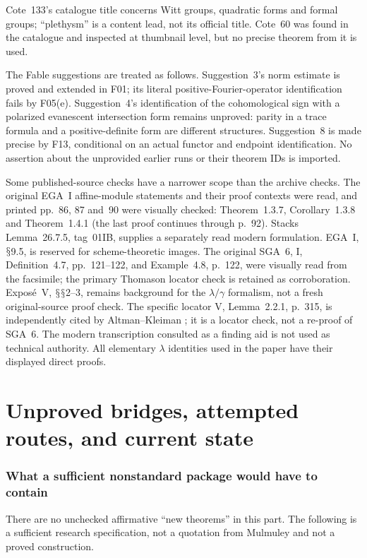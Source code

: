 \documentclass[11pt,a4paper]{article}
\renewcommand{\S}{\ensuremath{\mathsection}}
\newcommand{\fid}[1]{\textsf{#1}}\newcommand{\gate}[1]{\textsf{#1}}
\theoremstyle{named}\newtheorem{finding}{Finding}[section]
\theoremstyle{definition}\newtheorem{definition}[finding]{Definition}
\theoremstyle{remark}\newtheorem{remark}[finding]{Remark}
\begin{document}
Cote~133's catalogue title concerns Witt groups, quadratic forms and formal groups; ``plethysm'' is a content lead, not its official title. Cote~60 was found in the catalogue and inspected at thumbnail level, but no precise theorem from it is used.

The Fable suggestions are treated as follows. Suggestion~3's norm estimate is proved and extended in \fid{F01}; its literal positive-Fourier-operator identification fails by \fid{F05}(e). Suggestion~4's identification of the cohomological sign with a polarized evanescent intersection form remains unproved: parity in a trace formula and a positive-definite form are different structures. Suggestion~8 is made precise by \fid{F13}, conditional on an actual functor and endpoint identification. No assertion about the unprovided earlier runs or their theorem IDs is imported.

Some published-source checks have a narrower scope than the archive checks.
The original EGA~I affine-module statements and their proof
contexts were read, and printed pp.~86, 87 and~90 were visually
checked: Theorem~1.3.7, Corollary~1.3.8 and Theorem~1.4.1
(the last proof continues through p.~92). Stacks Lemma~26.7.5,
tag~01IB, supplies a separately read modern formulation.
EGA~I, \S9.5, is reserved for scheme-theoretic images.
The original SGA~6, I, Definition~4.7, pp.~121--122, and
Example~4.8, p.~122, were visually read from the facsimile;
the primary Thomason locator check
\cite[\S3.1, pp.~8--9]{ThomasonPerfect} is retained as
corroboration. Expos\'e~V, \S\S2--3, remains background for
the $\lambda/\gamma$ formalism, not a fresh original-source
proof check. The specific locator V, Lemma~2.2.1, p.~315, is independently cited by Altman--Kleiman \cite[\S2.10]{AK}; it is a locator check, not a re-proof of SGA~6. The modern transcription consulted as a finding aid is not used as technical authority. All elementary $\lambda$ identities used in the paper have their displayed direct proofs.

\part{Unproved bridges, attempted routes, and current state}
\section{What a sufficient nonstandard package would have to contain}\label{sec:gates}
There are no unchecked affirmative ``new theorems'' in this part. The following is a sufficient research specification, not a quotation from Mulmuley and not a proved construction.
\end{document}
